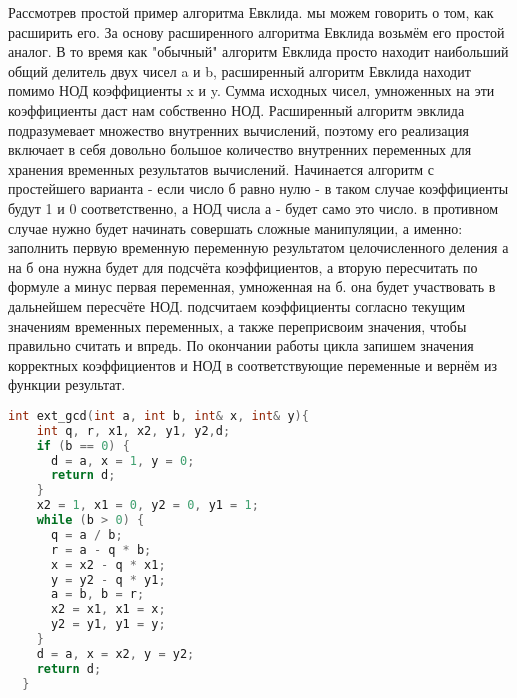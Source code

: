 \documentclass[fontsize=14bp]{report}
\begin{document}
Рассмотрев простой пример алгоритма Евклида. мы можем говорить о том, как расширить его. За основу расширенного алгоритма Евклида возьмём его простой аналог. В то время как "обычный" алгоритм Евклида просто находит наибольший общий делитель двух чисел a и b, расширенный алгоритм Евклида находит помимо НОД коэффициенты x и y. Сумма исходных чисел, умноженных на эти коэффициенты даст нам собственно НОД.
Расширенный алгоритм эвклида подразумевает множество внутренних вычислений, поэтому его реализация включает в себя довольно большое количество внутренних переменных для хранения временных результатов вычислений. Начинается алгоритм с простейшего варианта - если число б равно нулю - в таком случае коэффициенты будут 1 и 0 соответственно, а НОД числа а - будет само это число. в противном случае нужно будет начинать совершать сложные манипуляции, а именно: заполнить первую временную переменную результатом целочисленного деления а на б она нужна будет для подсчёта коэффициентов, а вторую пересчитать по формуле а минус первая переменная, умноженная на б. она будет участвовать в дальнейшем пересчёте НОД. подсчитаем коэффициенты согласно текущим значениям временных переменных, а также переприсвоим значения, чтобы правильно считать и впредь. По окончании работы цикла запишем значения корректных коэффициентов и НОД в соответствующие переменные и вернём из функции результат.
\begin{lstlisting}[language=C,style=CCodeStyle]
  int ext_gcd(int a, int b, int& x, int& y){
    int q, r, x1, x2, y1, y2,d;
    if (b == 0) {
      d = a, x = 1, y = 0;
      return d;
    }
    x2 = 1, x1 = 0, y2 = 0, y1 = 1;
    while (b > 0) {
      q = a / b;
      r = a - q * b;
      x = x2 - q * x1;
      y = y2 - q * y1;
      a = b, b = r;
      x2 = x1, x1 = x;
      y2 = y1, y1 = y;
    }
    d = a, x = x2, y = y2;
    return d;
  }

\end{lstlisting}
\end{document}
